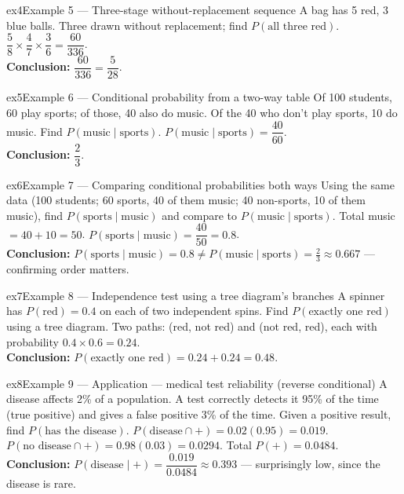 \documentclass[11pt]{article}
\begin{document}
\begin{example}{ex4}{Example 5 --- Three-stage without-replacement sequence}
A bag has 5 red, 3 blue balls. Three drawn without replacement; find $P(\text{all three red})$.\soln
$\dfrac58\times\dfrac47\times\dfrac36=\dfrac{60}{336}$.\\[3pt]\textbf{Conclusion:} $\dfrac{60}{336}=\dfrac{5}{28}$.
\end{example}

\begin{example}{ex5}{Example 6 --- Conditional probability from a two-way table}
Of 100 students, 60 play sports; of those, 40 also do music. Of the 40 who don't play sports, 10 do music. Find $P(\text{music}\mid\text{sports})$.\soln
$P(\text{music}\mid\text{sports})=\dfrac{40}{60}$.\\[3pt]\textbf{Conclusion:} $\dfrac23$.
\end{example}

\begin{example}{ex6}{Example 7 --- Comparing conditional probabilities both ways}
Using the same data (100 students; 60 sports, 40 of them music; 40 non-sports, 10 of them music), find $P(\text{sports}\mid\text{music})$ and compare to $P(\text{music}\mid\text{sports})$.\soln
Total music $=40+10=50$. $P(\text{sports}\mid\text{music})=\dfrac{40}{50}=0.8$.\\[3pt]\textbf{Conclusion:} $P(\text{sports}\mid\text{music})=0.8\neq P(\text{music}\mid\text{sports})=\tfrac23\approx0.667$ --- confirming order matters.
\end{example}

\begin{example}{ex7}{Example 8 --- Independence test using a tree diagram's branches}
A spinner has $P(\text{red})=0.4$ on each of two independent spins. Find $P(\text{exactly one red})$ using a tree diagram.\soln
Two paths: (red, not red) and (not red, red), each with probability $0.4\times0.6=0.24$.\\[3pt]\textbf{Conclusion:} $P(\text{exactly one red})=0.24+0.24=0.48$.
\end{example}

\begin{example}{ex8}{Example 9 --- Application --- medical test reliability (reverse conditional)}
A disease affects 2\% of a population. A test correctly detects it 95\% of the time (true positive) and gives a false positive 3\% of the time. Given a positive result, find $P(\text{has the disease})$.\soln
$P(\text{disease}\cap+)=0.02(0.95)=0.019$. $P(\text{no disease}\cap+)=0.98(0.03)=0.0294$. Total $P(+)=0.0484$.\\[3pt]\textbf{Conclusion:} $P(\text{disease}\mid+)=\dfrac{0.019}{0.0484}\approx0.393$ --- surprisingly low, since the disease is rare.
\end{example}
\end{document}
